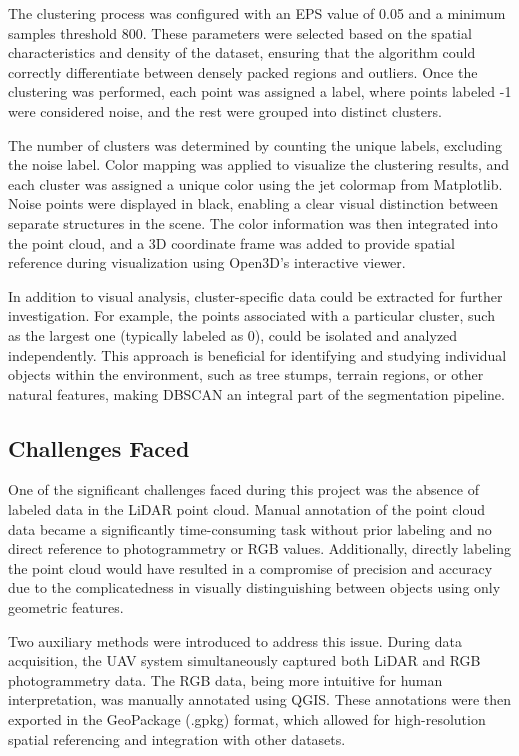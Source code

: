 \documentclass[../report.tex]{subfiles}
\begin{document}
        The clustering process was configured with an EPS value of 0.05 and a minimum samples threshold 800. These parameters were selected based on the spatial characteristics and density of the dataset, ensuring that the algorithm could correctly differentiate between densely packed regions and outliers. Once the clustering was performed, each point was assigned a label, where points labeled -1 were considered noise, and the rest were grouped into distinct clusters.\cite{dbscan_eps}\cite{dbscan_eps2}
        
        The number of clusters was determined by counting the unique labels, excluding the noise label. Color mapping was applied to visualize the clustering results, and each cluster was assigned a unique color using the jet colormap from Matplotlib. Noise points were displayed in black, enabling a clear visual distinction between separate structures in the scene. The color information was then integrated into the point cloud, and a 3D coordinate frame was added to provide spatial reference during visualization using Open3D’s interactive viewer.
        
        In addition to visual analysis, cluster-specific data could be extracted for further investigation. For example, the points associated with a particular cluster, such as the largest one (typically labeled as 0), could be isolated and analyzed independently. This approach is beneficial for identifying and studying individual objects within the environment, such as tree stumps, terrain regions, or other natural features, making DBSCAN an integral part of the segmentation pipeline.
	\subsection{Challenges Faced}
    One of the significant challenges faced during this project was the absence of labeled data in the LiDAR point cloud. Manual annotation of the point cloud data became a significantly time-consuming task without prior labeling and no direct reference to photogrammetry or RGB values. Additionally, directly labeling the point cloud would have resulted in a compromise of precision and accuracy due to the complicatedness in visually distinguishing between objects using only geometric features.

    Two auxiliary methods were introduced to address this issue. During data acquisition, the UAV system simultaneously captured both LiDAR and RGB photogrammetry data. The RGB data, being more intuitive for human interpretation, was manually annotated using QGIS. These annotations were then exported in the GeoPackage (.gpkg) format, which allowed for high-resolution spatial referencing and integration with other datasets.\cite{gdal2025gpkg}
    
\end{document}
